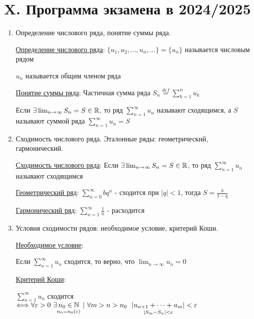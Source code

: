 \documentclass[12pt]{article}
\begin{document}
\clearpage

\section{X. Программа экзамена в 2024/2025}


\begin{enumerate}
\subsection{X.1. Числовые ряды.}

    \item Определение числового ряда, понятие суммы ряда.

    \hyperlink{numberseriesdefinition}{Определение числового ряда}: $\{u_1, u_2, \dots, u_n, \dots\} = \{u_n\}$ называется числовым рядом

    $u_n$ называется общим членом ряда
    
    \hyperlink{sumofseriesdefinition}{Понятие суммы ряда}: Частичная сумма ряда $S_n \stackrel{def}{=} \sum_{k = 1}^{n} u_k$

    Если $\exists \lim_{n \to\infty} S_n = S \in \mathbb{R}$, то ряд $\sum_{n = 1}^\infty u_n$ называют сходящимся,
    а $S$ называют суммой ряда $\sum_{n = 1}^\infty u_n = S$

    \item Сходимость числового ряда. Эталонные ряды: геометрический, гармонический.

    \hyperlink{seriesconvergence}{Сходимость числового ряда}: Если $\exists \lim_{n \to\infty} S_n = S \in \mathbb{R}$, то ряд $\sum_{n = 1}^\infty u_n$ называют сходящимся

    \hyperlink{geometricseries}{Геометрический ряд}: $\sum_{n = 0}^\infty b q^n$ - сходится при $|q| < 1$, тогда $S = \frac{b}{1 - q}$
    
    \hyperlink{harmonicseries}{Гармонический ряд}: $\sum_{n = 1}^\infty \frac{1}{n}$ - расходится

    \item Условия сходимости рядов: необходимое условие, критерий Коши.

    \hyperlink{necessarycondition}{Необходимое условие}: 

    \Ths Если $\sum_{n = 1}^\infty u_n$ сходится, то верно, что $\lim_{n \to \infty} u_n = 0$

    \hyperlink{cauchycriteria}{Критерий Коши}:

    \Ths $\sum_{n = 1}^\infty u_n$ сходится $\Longleftrightarrow \forall \varepsilon > 0 \ \exists \underset{n_0 = n_0 (\varepsilon)}{n_0 \in \mathbb{N}} \ | \ \forall m > n > n_0 \ \ \underset{|S_m - S_n| < \varepsilon}{|u_{n + 1} + \dots + u_m|} < \varepsilon$


\end{enumerate}
\end{document}
